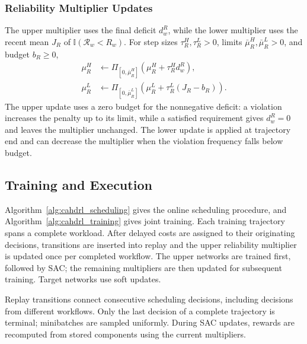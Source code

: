 \documentclass[journal]{IEEEtran}
\newcommand{\ind}{\mathbb{I}}
\begin{document}
\subsubsection{Reliability Multiplier Updates}
The upper multiplier uses the final deficit $d_w^R$, while the lower multiplier uses the recent mean $J_R$ of $\ind(\mathcal R_w<R_w)$. For step sizes $\tau_R^H,\tau_R^L>0$, limits $\bar\mu_R^H,\bar\mu_R^L>0$, and budget $b_R\geq0$,
\begin{equation}
\begin{aligned}
    \mu_R^H&\leftarrow
        \Pi_{[0,\bar\mu_R^H]}(\mu_R^H+\tau_R^H d_w^R),\\
    \mu_R^L&\leftarrow
        \Pi_{[0,\bar\mu_R^L]}
        \left(\mu_R^L+\tau_R^L(J_R-b_R)\right).
\end{aligned}
    \label{eq:method_reliability_duals}
\end{equation}
The upper update uses a zero budget for the nonnegative deficit: a violation increases the penalty up to its limit, while a satisfied requirement gives $d_w^R=0$ and leaves the multiplier unchanged. The lower update is applied at trajectory end and can decrease the multiplier when the violation frequency falls below budget.
\subsection{Training and Execution}
\label{subsec:training}

Algorithm~\ref{alg:cahdrl_scheduling} gives the online scheduling procedure, and Algorithm~\ref{alg:cahdrl_training} gives joint training. Each training trajectory spans a complete workload. After delayed costs are assigned to their originating decisions, transitions are inserted into replay and the upper reliability multiplier is updated once per completed workflow. The upper networks are trained first, followed by SAC; the remaining multipliers are then updated for subsequent training. Target networks use soft updates.

Replay transitions connect consecutive scheduling decisions, including decisions from different workflows. Only the last decision of a complete trajectory is terminal; minibatches are sampled uniformly. During SAC updates, rewards are recomputed from stored components using the current multipliers.
\end{document}
